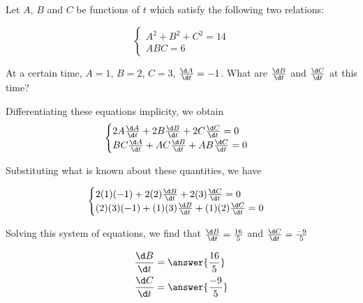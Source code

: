 \documentclass{ximera}
\author{Steven Gubkin}
\begin{document}
\begin{exercise}



Let $A$, $B$ and $C$ be functions of $t$ which satisfy the following two relations:

\[
\begin{cases}
	A^2+B^2+C^2 = 14 \\
	ABC = 6 
\end{cases}
\]

At a certain time, $A = 1$, $B=2$, $C=3$, $\frac{\d A}{\d t} = -1$.  What are $\frac{\d B}{\d t}$ and $\frac{\d C}{\d t}$ at this time? 

\begin{hint}
	Differentiating these equations implicity, we obtain
\[
\begin{cases}
	2A\frac{\d A}{\d t}+2B\frac{\d B}{\d t}+2C \frac{\d C}{\d t} = 0\\
	BC\frac{\d A}{\d t}+AC\frac{\d B}{\d t}+AB\frac{\d C}{\d t} = 0
\end{cases}
\]

\end{hint}

\begin{hint}
	Substituting what is known about these quantities, we have

\[
\begin{cases}
	2(1)(-1)+2(2)\frac{\d B}{\d t}+2(3) \frac{\d C}{\d t} = 0\\
	(2)(3)(-1) +(1)(3)\frac{\d B}{\d t}+(1)(2)\frac{\d C}{\d t} = 0
\end{cases}
\]
\end{hint}

Solving this system of equations, we find that $\frac{\d B}{\d t} = \frac{16}{5} $ and $\frac{\d C}{\d t} = \frac{-9}{5}$


\begin{prompt}
	\begin{align*}
	\frac{\d B}{\d t} &= \answer{\frac{16}{5} } \\
	\frac{\d C}{\d t} &= \answer{\frac{-9}{5}}
	\end{align*}
\end{prompt}

\end{exercise}
\end{document}
